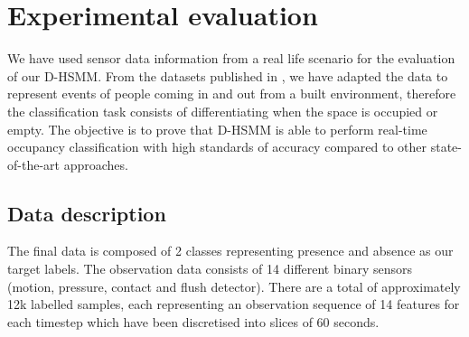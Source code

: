 \documentclass[conference]{IEEEtran}
\begin{document}
%	




\section{Experimental evaluation}
We have used sensor data information from a real life scenario for the evaluation of our D-HSMM. From the datasets published in \cite{Kasteren2011a}, we have adapted the data to represent events of people coming in and out from a built environment, therefore the classification task consists of differentiating when the space is occupied or empty. The objective is to prove that D-HSMM is able to perform real-time occupancy classification with high standards of accuracy compared to other state-of-the-art approaches.

\subsection{Data description}
The final data is composed of 2 classes representing presence and absence as our target labels. The observation data consists of 14 different binary sensors (motion, pressure, contact and flush detector). There are a total of approximately 12k labelled samples, each representing an observation sequence of 14 features for each timestep which have been discretised into slices of 60 seconds. 
\end{document}
